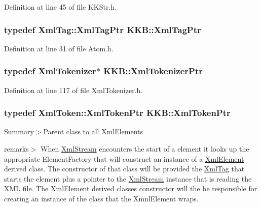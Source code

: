 Definition at line 45 of file K\+K\+Str.\+h.

\subsubsection[{\texorpdfstring{Xml\+Tag\+Ptr}{XmlTagPtr}}]{\setlength{\rightskip}{0pt plus 5cm}typedef {\bf Xml\+Tag\+::\+Xml\+Tag\+Ptr} {\bf K\+K\+B\+::\+Xml\+Tag\+Ptr}}\hypertarget{namespace_k_k_b_a9253a3ea8a5da18ca82be4ca2b390ef0}{}\label{namespace_k_k_b_a9253a3ea8a5da18ca82be4ca2b390ef0}


Definition at line 31 of file Atom.\+h.

\subsubsection[{\texorpdfstring{Xml\+Tokenizer\+Ptr}{XmlTokenizerPtr}}]{\setlength{\rightskip}{0pt plus 5cm}typedef {\bf Xml\+Tokenizer}$\ast$ {\bf K\+K\+B\+::\+Xml\+Tokenizer\+Ptr}}\hypertarget{namespace_k_k_b_a0272123692093dc63b5e530719bc874e}{}\label{namespace_k_k_b_a0272123692093dc63b5e530719bc874e}


Definition at line 117 of file Xml\+Tokenizer.\+h.

\subsubsection[{\texorpdfstring{Xml\+Token\+Ptr}{XmlTokenPtr}}]{\setlength{\rightskip}{0pt plus 5cm}typedef {\bf Xml\+Token\+::\+Xml\+Token\+Ptr} {\bf K\+K\+B\+::\+Xml\+Token\+Ptr}}\hypertarget{namespace_k_k_b_af349a060847626df6b468fe15d373972}{}\label{namespace_k_k_b_af349a060847626df6b468fe15d373972}
Summary$>$Parent class to all Xml\+Elements

remarks$>$ When \hyperlink{class_k_k_b_1_1_xml_stream}{Xml\+Stream} encounters the start of a element it looks up the appropriate Element\+Factory that will construct an instance of a \hyperlink{class_k_k_b_1_1_xml_element}{Xml\+Element} derived class. The constructor of that class will be provided the \hyperlink{class_k_k_b_1_1_xml_tag}{Xml\+Tag} that starts the element plus a pointer to the \hyperlink{class_k_k_b_1_1_xml_stream}{Xml\+Stream} instance that is reading the X\+ML file. The \hyperlink{class_k_k_b_1_1_xml_element}{Xml\+Element} derived classes constructor will the be responsible for creating an instance of the class that the Xmnl\+Element wraps.

